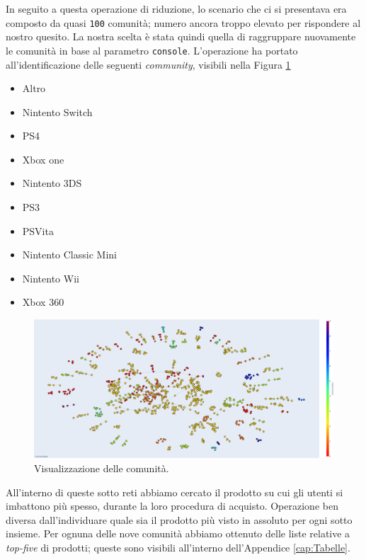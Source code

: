 			In seguito a questa operazione di riduzione, lo scenario che ci si presentava era composto da quasi \verb|100| comunità; numero ancora troppo elevato per rispondere al nostro quesito. La nostra scelta è stata quindi quella di raggruppare nuovamente le comunità in base al parametro \verb|console|. L'operazione ha portato all'identificazione delle seguenti \textit{community}, visibili nella Figura \ref{fig:communities}
			\begin{itemize}			
				\item Altro
				\item Nintento Switch
				\item PS4
				\item Xbox one
				\item Nintento 3DS
				\item PS3
				\item PSVita
				\item Nintento Classic Mini
				\item Nintento Wii
				\item Xbox 360
			\end{itemize}
		
			\begin{figure} [h]
				\includegraphics[width=\textwidth]{Figure/communities}
				\caption{Visualizzazione delle comunità.}
				\label{fig:communities}
			\end{figure} 
		
			All'interno di queste sotto reti abbiamo cercato il prodotto su cui gli utenti si imbattono più spesso, durante la loro procedura di acquisto. Operazione ben diversa dall'individuare quale sia il prodotto più visto in assoluto per ogni sotto insieme. Per ognuna delle nove comunità abbiamo ottenuto delle liste relative a \textit{top-five} di prodotti; queste sono visibili all'interno dell'Appendice \ref{cap:Tabelle}.  
			